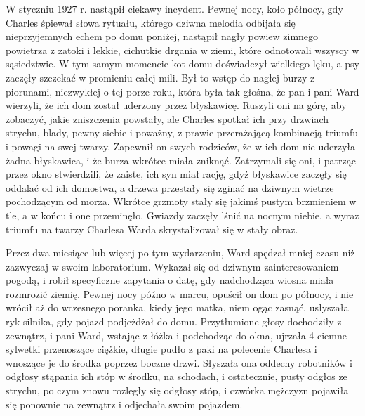 W styczniu 1927 r. nastąpił ciekawy incydent. Pewnej nocy, koło północy, gdy Charles śpiewał słowa rytuału, którego dziwna melodia odbijała się nieprzyjemnych echem po domu poniżej, nastąpił nagły powiew zimnego powietrza z zatoki i lekkie, cichutkie drgania w ziemi, które odnotowali wszyscy w sąsiedztwie. W tym samym momencie kot domu doświadczył wielkiego lęku, a psy zaczęły szczekać w promieniu całej mili. Był to wstęp do nagłej burzy z piorunami, niezwykłej o tej porze roku, która była tak głośna, że pan i pani Ward wierzyli, że ich dom został uderzony przez błyskawicę. Ruszyli oni na górę, aby zobaczyć, jakie zniszczenia powstały, ale Charles spotkał ich przy drzwiach strychu, blady, pewny siebie i poważny, z prawie przerażającą kombinacją triumfu i powagi na swej twarzy. Zapewnił on swych rodziców, że w ich dom nie uderzyła żadna błyskawica, i że burza wkrótce miała zniknąć. Zatrzymali się oni, i patrząc przez okno stwierdzili, że zaiste, ich syn miał rację, gdyż błyskawice zaczęły się oddalać od ich domostwa, a drzewa przestały się zginać na dziwnym wietrze pochodzącym od morza. Wkrótce grzmoty stały się jakimś pustym brzmieniem w tle, a w końcu i one przeminęło. Gwiazdy zaczęły lśnić na nocnym niebie, a wyraz triumfu na twarzy Charlesa Warda skrystalizował się w stały obraz. 

Przez dwa miesiące lub więcej po tym wydarzeniu, Ward spędzał mniej czasu niż zazwyczaj w swoim laboratorium. Wykazał się od dziwnym zainteresowaniem pogodą, i robił specyficzne zapytania o datę, gdy nadchodząca wiosna miała rozmrozić ziemię. Pewnej nocy późno w marcu, opuścił on dom po północy, i nie wrócił aż do wczesnego poranka, kiedy jego matka, niem ogąc zasnąć, usłyszała ryk silnika, gdy pojazd podjeżdżał do domu. Przytłumione głosy dochodziły z zewnątrz, i pani Ward, wstając z łóżka i podchodząc do okna, ujrzała 4 ciemne sylwetki przenoszące ciężkie, długie pudło z paki na polecenie Charlesa i wnoszące je do środka poprzez boczne drzwi. Słyszała ona oddechy robotników i odgłosy stąpania ich stóp w środku, na schodach, i ostatecznie, pusty odgłos ze strychu, po czym znowu rozległy się odgłosy stóp, i czwórka mężczyzn pojawiła się ponownie na zewnątrz i odjechała swoim pojazdem.  

